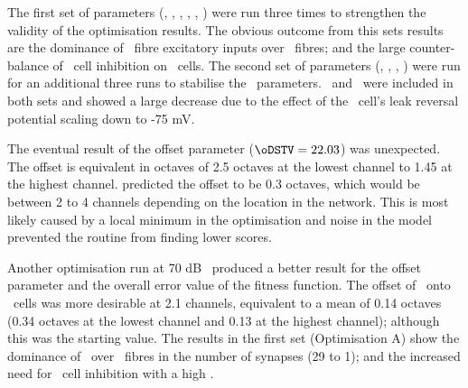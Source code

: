 The first set of parameters (\nDSTV, \wDSTV, \nLSRTV, \nHSRTV, \wLSRTV, \wHSRTV) were run three times to strengthen the validity of the optimisation results.
The obvious outcome from this sets results are the dominance of \LSR~fibre excitatory inputs over \HSR~fibres; and the large counter-balance of \DS~cell inhibition on \TV~cells.
The second set of parameters (\sDSTV, \Eleak \oDSTV, \nDSTV, \wDSTV) were run for an additional three runs to stabilise the \DSTV~parameters.
\nDSTV~and \wDSTV~were included in both sets and showed a large decrease due to the effect of the \TV~cell's leak reversal potential \Eleak scaling down to -75 mV\@.


The eventual result of the offset parameter ($\oDSTV = 22.03$) was unexpected.
The offset is equivalent in octaves of 2.5 octaves at the lowest channel to 1.45 at the highest channel.
\citet{ReissYoung:2005} predicted the offset to be 0.3 octaves, which would be between 2 to 4 channels depending on the location in the network.
This is most likely caused by a local minimum in the optimisation and noise in the model prevented the routine from finding lower scores.


Another optimisation run at 70 dB \SPL~produced a better result for the offset parameter and the overall error value of the fitness function.
The offset of \DS~onto \TV~cells was more desirable at 2.1 channels, equivalent to a mean of 0.14 octaves (0.34 octaves at the lowest channel and 0.13 at the highest channel); although this was the starting value.
The results in the first set (Optimisation A) show the dominance of \LSR~over \HSR~fibres in the number of synapses (29 to 1); and the increased need for \DS~cell inhibition with a high \nDSTV.

